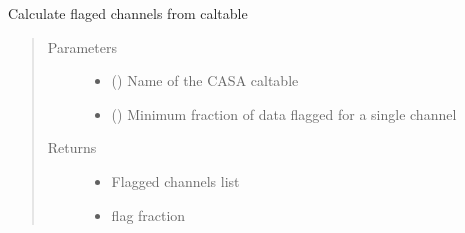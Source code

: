 \documentclass[letterpaper,10pt,english]{sphinxmanual}
\begin{document}

\begin{fulllineitems}
\label{\detokenize{paircars:paircars.basic_func.calc_flag_chans_caltable}}
\sphinxAtStartPar
Calculate flaged channels from caltable
\begin{quote}\begin{description}
\item[{Parameters}] \leavevmode\begin{itemize}
\item {} 
\sphinxAtStartPar
{} () \textendash{} Name of the CASA caltable

\item {} 
\sphinxAtStartPar
{} () \textendash{} Minimum fraction of data flagged for a single channel

\end{itemize}

\item[{Returns}] \leavevmode
\sphinxAtStartPar
\begin{itemize}
\item {} 
\sphinxAtStartPar
{} \textendash{} Flagged channels list

\item {} 
\sphinxAtStartPar
{} \textendash{} flag fraction

\end{itemize}


\end{description}\end{quote}

\end{fulllineitems}

\end{document}
